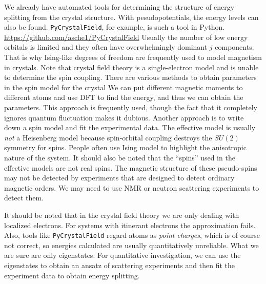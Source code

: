 \documentclass[hyperref, a4paper]{article}
\begin{document}
We already have automated tools for determining the structure of energy splitting from the crystal structure. 
With pesudopotentials, the energy levels can also be found.
\texttt{PyCrystalField}, for example, is such a tool in Python. \url{https://github.com/asche1/PyCrystalField}
Usually the number of low energy orbitals is limited and they often have overwhelmingly dominant $j$ components.
That is why Ising-like degrees of freedom are frequently used to model magnetism in crystals.
Note that crystal field theory is a single-electron model and is unable to determine the spin coupling.
There are various methods to obtain parameters in the spin model for the crystal
We can put different magnetic moments to different atoms and use DFT to find the energy, 
and thus we can obtain the parameters. This approach is frequently used, though the fact that it completely
ignores quantum fluctuation makes it dubious. Another approach is to write down a spin model and fit the experimental data.
The effective model is usually \emph{not} a Heisenberg model because spin-orbital coupling destroys the $SU(2)$ 
symmetry for spins. People often use Ising model to highlight the anisotropic nature of the system.
It should also be noted that the ``spins'' used in the effective models are not real spins.
The magnetic structure of these pseudo-spins may not be detected by experiments that are designed to detect ordinary
magnetic orders. We may need to use NMR or neutron scattering experiments to detect them.

It should be noted that in the crystal field theory we are only dealing with localized electrons. 
For systems with itinerant electrons the approximation fails.
Also, tools like \texttt{PyCrystalField} regard atoms as \emph{point charges}, which is of course not 
correct, so energies calculated are usually quantitatively unreliable.
What we are sure are only eigenstates. For quantitative investigation, we can use the eigenstates to obtain 
an ansatz of scattering experiments and then fit the experiment data to obtain energy splitting.
\end{document}
